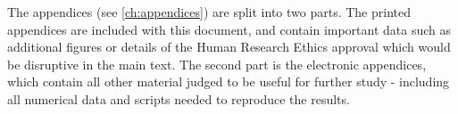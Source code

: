 The appendices (see \cref{ch:appendices}) are split into two parts.
The printed appendices are included with this document, and contain
important data such as additional figures or details of the Human Research Ethics
approval which would be disruptive in the main text.  The second part
is the electronic appendices, which contain all other material judged to
be useful for further study - including all numerical data and scripts
needed to reproduce the results.

